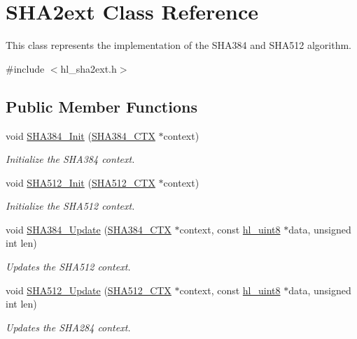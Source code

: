 \hypertarget{class_s_h_a2ext}{
\section{SHA2ext Class Reference}
\label{class_s_h_a2ext}
}


This class represents the implementation of the SHA384 and SHA512 algorithm.  


{\ttfamily \#include $<$hl\_\-sha2ext.h$>$}\subsection*{Public Member Functions}
\begin{DoxyCompactItemize}
\item 
void \hyperlink{class_s_h_a2ext_a9d1e59ec49bf28e9ce1b059e0d34492b}{SHA384\_\-Init} (\hyperlink{struct_s_h_a512___c_t_x}{SHA384\_\-CTX} $\ast$context)
\begin{DoxyCompactList}\small\item\em Initialize the SHA384 context. \item\end{DoxyCompactList}\item 
void \hyperlink{class_s_h_a2ext_aedf1c75293856456cbdba6c5aca62fdd}{SHA512\_\-Init} (\hyperlink{struct_s_h_a512___c_t_x}{SHA512\_\-CTX} $\ast$context)
\begin{DoxyCompactList}\small\item\em Initialize the SHA512 context. \item\end{DoxyCompactList}\item 
void \hyperlink{class_s_h_a2ext_a910da8d255cde7a69d0149c7ad15fce3}{SHA384\_\-Update} (\hyperlink{struct_s_h_a512___c_t_x}{SHA384\_\-CTX} $\ast$context, const \hyperlink{hl__types_8h_adc1917ae5f0dc40725be12536ffe0a6c}{hl\_\-uint8} $\ast$data, unsigned int len)
\begin{DoxyCompactList}\small\item\em Updates the SHA512 context. \item\end{DoxyCompactList}\item 
void \hyperlink{class_s_h_a2ext_a11dbee3c0b8423d99d1b6a2ab82578b8}{SHA512\_\-Update} (\hyperlink{struct_s_h_a512___c_t_x}{SHA512\_\-CTX} $\ast$context, const \hyperlink{hl__types_8h_adc1917ae5f0dc40725be12536ffe0a6c}{hl\_\-uint8} $\ast$data, unsigned int len)
\begin{DoxyCompactList}\small\item\em Updates the SHA284 context. \item\end{DoxyCompactList}\item 

\end{DoxyCompactItemize}
